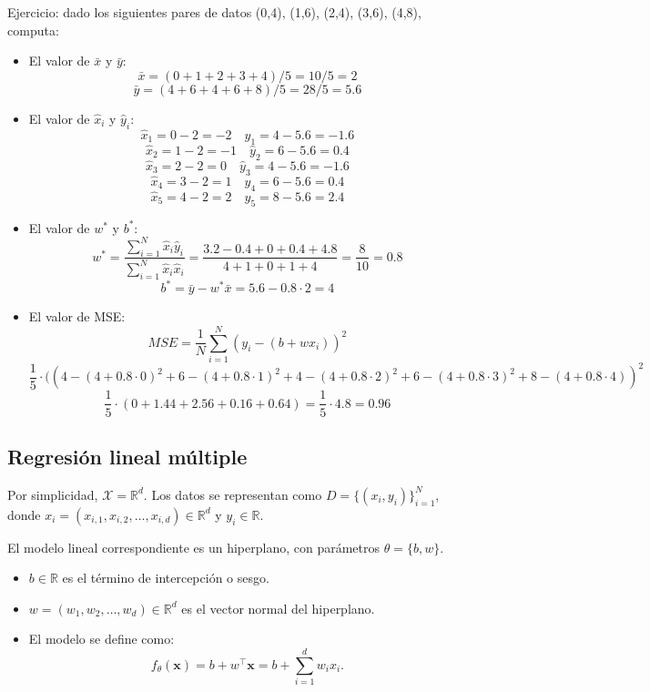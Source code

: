 Ejercicio: dado los siguientes pares de datos (0,4), (1,6), (2,4), (3,6), (4,8), computa:
\begin{itemize}
\item El valor de $\bar{x}$ y $\bar{y}$: 
$$\bar{x} = (0 + 1 + 2 + 3 + 4)/5 = 10/5 = 2$$
$$\bar{y} = (4 + 6 + 4 + 6 + 8)/5 = 28/5 = 5.6$$

\item El valor de $\hat{x}_i$ y $\hat{y}_i$:
$$\hat{x}_1 = 0 - 2 = -2 \quad \hat{y}_1 = 4 - 5.6 = -1.6$$
$$\hat{x}_2 = 1 - 2 = -1 \quad \hat{y}_2 = 6 - 5.6 = 0.4$$
$$\hat{x}_3 = 2 - 2 = 0 \quad \hat{y}_3 = 4 - 5.6 = -1.6$$
$$\hat{x}_4 = 3 - 2 = 1 \quad \hat{y}_4 = 6 - 5.6 = 0.4$$
$$\hat{x}_5 = 4 - 2 = 2 \quad \hat{y}_5 = 8 - 5.6 = 2.4$$

\item El valor de $w^*$ y $b^*$:
$$w^* = \frac{\sum^N_{i=1} \hat{x}_i\hat{y}_i}{\sum^N_{i=1} \hat{x}_i\hat{x}_i} = \frac{3.2 - 0.4 + 0 + 0.4 + 4.8 }{4 + 1 + 0 + 1 + 4} = \frac{8}{10} = 0.8$$
$$b^* = \bar{y} - w^*\bar{x} = 5.6 - 0.8 \cdot 2 = 4$$

\item El valor de MSE:
$$MSE = \frac{1}{N} \sum^N_{i=1} (y_i - (b + wx_i))^2$$
$$\frac{1}{5} \cdot ((4 - (4 + 0.8\cdot 0)^2 + 6 - (4 + 0.8\cdot 1)^2 + 4 - (4 + 0.8\cdot 2)^2 + 6 - (4 + 0.8\cdot 3)^2 + 8 - (4 + 0.8\cdot 4))^2$$
$$\frac{1}{5} \cdot (0 + 1.44 + 2.56 + 0.16 + 0.64) = \frac{1}{5} \cdot 4.8 = 0.96$$
\end{itemize}

\subsection{Regresión lineal múltiple}
Por simplicidad, $\mathcal{X} = \mathbb{R}^d$. Los datos se representan como $D = \{ (x_i, y_i) \}_{i=1}^N$, donde $x_i = (x_{i,1}, x_{i,2}, \ldots, x_{i,d}) \in \mathbb{R}^d$ y $y_i \in \mathbb{R}$.

El modelo lineal correspondiente es un hiperplano, con parámetros $\theta = \{ b, w \}$.
\begin{itemize}
\item $b \in \mathbb{R}$ es el término de intercepción o sesgo.
\item $w = (w_1, w_2, \ldots, w_d) \in \mathbb{R}^d$ es el vector normal del hiperplano.
\item El modelo se define como:    
    $$f_\theta (\mathbf{x}) = b + w^\top \mathbf{x} = b + \sum_{i=1}^d w_i x_i.$$
\end{itemize}

